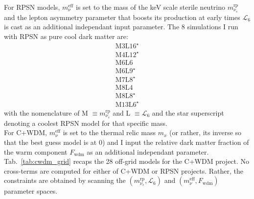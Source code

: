 For RPSN models, $m_\nu^{\mathrm{eff}}$ is set to the mass of the keV scale sterile neutrino $m^{\mathrm{rp}}_{\nu_s}$ and the lepton asymmetry parameter that boosts its production at early times $\mathcal{L}_6$ is cast as an additional independant input parameter. The 8 simulations I run with RPSN as pure cool dark matter are:
\begin{equation}
\label{eq:RPSN_models_simu}
\begin{array}{c}
\mathrm{M}3\mathrm{L}16^\star \\
\mathrm{M}4\mathrm{L}12^\star \\
\mathrm{M}6\mathrm{L}6 \\
\mathrm{M}6\mathrm{L}9^\star \\
\mathrm{M}7\mathrm{L}8^\star \\
\mathrm{M}8\mathrm{L}4 \\
\mathrm{M}8\mathrm{L}8^\star \\
\mathrm{M}13\mathrm{L}6^\star
\end{array}
\end{equation} with the nomenclature of M $\equiv m^{\mathrm{rp}}_{\nu_s}$ and L $\equiv \mathcal{L}_6$ and the star superscript denoting a coolest RPSN model for that specific mass.\\


For C+WDM, $m_\nu^{\mathrm{eff}}$ is set to the thermal relic mass $m_x$ (or rather, its inverse so that the best guess model is at $0$) and I input the relative dark matter fraction of the warm component $F_{\mathrm{wdm}}$ as an additional independant parameter. Tab.~\ref{tab:cwdm_grid} recaps the 28 off-grid models for the C+WDM project. No cross-terms are computed for either of C+WDM or RPSN projects. Rather, the constraints are obtained by scanning the $\left( m_{\nu_s}^{\mathrm{rp}}, \mathcal{L}_6 \right)$ and $\left( m^{\mathrm{eff}}_\nu, F_{\mathrm{wdm}} \right)$ parameter spaces.

